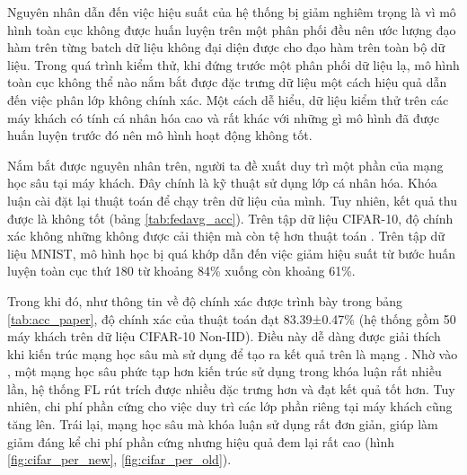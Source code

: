 Nguyên nhân dẫn đến việc hiệu suất của hệ thống bị giảm nghiêm trọng là vì mô hình toàn cục không được huấn luyện trên một phân phối đều nên ước lượng đạo hàm trên từng batch dữ liệu không đại diện được cho đạo hàm trên toàn bộ dữ liệu. Trong quá trình kiểm thử, khi đứng trước một phân phối dữ liệu lạ, mô hình toàn cục không thể nào nắm bắt được đặc trưng dữ liệu một cách hiệu quả dẫn đến việc phân lớp không chính xác. Một cách dễ hiểu, dữ liệu kiểm thử trên các máy khách có tính cá nhân hóa cao và rất khác với những gì mô hình đã được huấn luyện trước đó nên mô hình hoạt động không tốt.

Nắm bắt được nguyên nhân trên, người ta đề xuất duy trì một phần của mạng học sâu tại máy khách. Đây chính là kỹ thuật sử dụng lớp cá nhân hóa. Khóa luận cài đặt lại thuật toán  để chạy trên dữ liệu của mình. Tuy nhiên, kết quả thu được là không tốt (bảng \ref{tab:fedavg_acc}). Trên tập dữ liệu CIFAR-10, độ chính xác không những không được cải thiện mà còn tệ hơn thuật toán . Trên tập dữ liệu MNIST, mô hình học bị quá khớp dẫn đến việc giảm hiệu suất từ bước huấn luyện toàn cục thứ 180 từ khoảng 84\% xuống còn khoảng 61\%.

Trong khi đó, như thông tin về độ chính xác được trình bày trong bảng \ref{tab:acc_paper}, độ chính xác của thuật toán  đạt 83.39±0.47\% (hệ thống gồm 50 máy khách trên dữ liệu CIFAR-10 Non-IID). Điều này dễ dàng được giải thích khi kiến trúc mạng học sâu mà  sử dụng để tạo ra kết quả trên là mạng  \cite{howard2017mobilenets}. Nhờ vào , một mạng học sâu phức tạp hơn kiến trúc sử dụng trong khóa luận rất nhiều lần, hệ thống FL rút trích được nhiều đặc trưng hơn và đạt kết quả tốt hơn. Tuy nhiên, chi phí phần cứng cho việc duy trì các lớp phần riêng tại máy khách cũng tăng lên. Trái lại, mạng học sâu mà khóa luận sử dụng rất đơn giản, giúp làm giảm đáng kể chi phí phần cứng nhưng hiệu quả đem lại rất cao (hình \ref{fig:cifar_per_new}, \ref{fig:cifar_per_old}).

